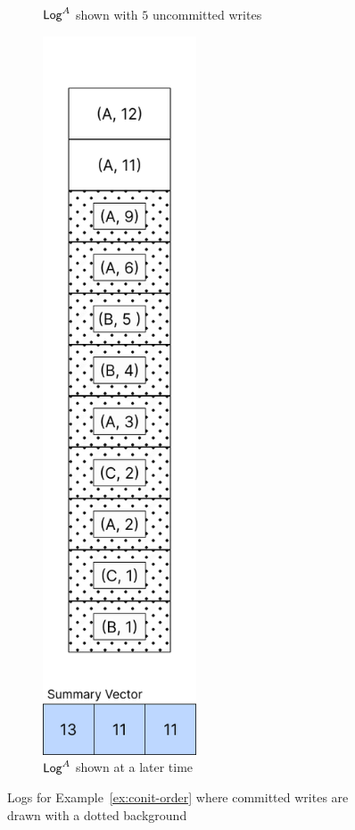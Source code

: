 \documentclass[]             %
{NASA}                       %
\theoremstyle{definition}
\begin{document}
\begin{figure}
\begin{subfigure}{0.5\textwidth}
    \caption{$\mathsf{Log}^{A}$ shown with $5$ uncommitted writes}
    \label{fig:conit-order-a}
  \end{subfigure}%
  \begin{subfigure}{0.5\textwidth}
    \centering
    \includegraphics[width=0.5\textwidth]{images/conit/Order2.png}
    \caption{$\mathsf{Log}^{A}$ shown at a later time}
    \label{fig:conit-order-b}
  \end{subfigure}
  \caption{Logs for Example~\ref{ex:conit-order} where committed writes are drawn with a dotted background}
  \label{fig:conit-order}
\end{figure}
\end{document}
